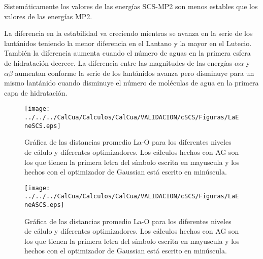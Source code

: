 Sistem\'aticamente los valores de las energ\'ias SCS-MP2 son menos
estables que los valores de las energ\'ias MP2. 

La diferencia en la estabilidad va creciendo mientras se avanza en la
serie de los lant\'anidos teniendo la menor diferencia en el Lantano 
y la mayor en el Lutecio. Tambi\'en la diferencia aumenta cuando el
n\'umero de aguas en la primera esfera de hidrataci\'on decrece. 
La diferencia entre las magnitudes de las energ\'ias $\alpha\alpha$
y $\alpha\beta$ aumentan conforme la serie de los lant\'anidos avanza
pero disminuye para un mismo lant\'anido cuando disminuye el n\'umero
de mol\'eculas de agua en la primera capa de hidrataci\'on.
\begin{figure}[h]
\centering
\texttt{[image: ../../../CalCua/Calculos/CalCua/VALIDACION/cSCS/Figuras/LaEneSCS.eps]}
\caption{\small{Gr\'afica de las distancias promedio La-O para los
diferentes niveles de c\'alulo y diferentes optimizadores. Los 
c\'alculos hechos con AG son los que tienen la primera letra del 
s\'imbolo escrita en mayuscula y los hechos con el optimizador de 
Gaussian est\'a escrito en min\'uscula.}}
\label{fig11}
\end{figure}
\begin{figure}[h]
\centering
\texttt{[image: ../../../CalCua/Calculos/CalCua/VALIDACION/cSCS/Figuras/LaEneASCS.eps]}
\caption{\small{Gr\'afica de las distancias promedio La-O para los
diferentes niveles de c\'alulo y diferentes optimizadores. Los 
c\'alculos hechos con AG son los que tienen la primera letra del 
s\'imbolo escrita en mayuscula y los hechos con el optimizador de 
Gaussian est\'a escrito en min\'uscula.}}
\label{fig111}
\end{figure}

